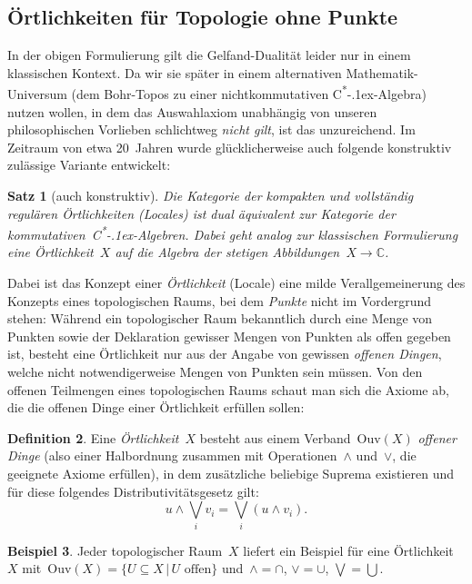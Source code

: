 \documentclass[a4paper,ngerman,12pt]{scrartcl}
\theoremstyle{definition}
\newtheorem{defn}{Definition}[section]
\newtheorem{bsp}[defn]{Beispiel}
\theoremstyle{plain}
\newtheorem{satz}[defn]{Satz}
\theoremstyle{remark}
\newcommand{\CC}{\mathbb{C}}
\newcommand{\Ouv}{\mathrm{Ouv}}
\newcommand{\csalgebra}{C\textsuperscript{*}\kern-.1ex-Algebra}
\newcommand{\csalgebren}{C\textsuperscript{*}\kern-.1ex-Alge\-bren}
\renewcommand{\_}{\mathpunct{.}\,}
\newcommand{\?}{\,{:}\,}
\begin{document}
\subsection{Örtlichkeiten für Topologie ohne Punkte}

In der obigen Formulierung gilt die Gelfand-Dualität leider nur in einem
klassischen Kontext. Da wir sie später in einem alternativen
Mathematik-Universum (dem Bohr-Topos zu einer nichtkommutativen \csalgebra)
nutzen wollen, in dem das Auswahlaxiom unabhängig von unseren philosophischen
Vorlieben schlichtweg \emph{nicht gilt}, ist das unzureichend. Im Zeitraum von
etwa 20~Jahren wurde glücklicherweise auch folgende konstruktiv zulässige Variante
entwickelt:

\begin{satz}[auch konstruktiv]Die Kategorie der kompakten und vollständig
regulären Örtlichkeiten (Locales) ist dual äquivalent zur Kategorie der
kommutativen~\csalgebren. Dabei geht analog zur klassischen Formulierung eine
Örtlichkeit~$X$ auf die Algebra der stetigen Abbildungen~$X \to \CC$.
\end{satz}

Dabei ist das Konzept einer \emph{Örtlichkeit} (Locale) eine milde
Verallgemeinerung des Konzepts eines topologischen Raums, bei dem \emph{Punkte}
nicht im Vordergrund stehen: Während ein topologischer Raum bekanntlich durch
eine Menge von Punkten sowie der Deklaration gewisser Mengen von Punkten als
offen gegeben ist, besteht eine Örtlichkeit nur aus der Angabe von
gewissen \emph{offenen Dingen}, welche nicht notwendigerweise Mengen von
Punkten sein müssen. Von den offenen Teilmengen eines topologischen Raums
schaut man sich die Axiome ab, die die offenen Dinge einer Örtlichkeit
erfüllen sollen:

\begin{defn}Eine \emph{Örtlichkeit}~$X$ besteht aus einem Verband~$\Ouv(X)$
\emph{offener Dinge} (also einer Halbordnung zusammen mit Operationen~$\wedge$
und~$\vee$, die geeignete Axiome erfüllen), in dem zusätzliche beliebige
Suprema existieren und für diese folgendes Distributivitätsgesetz gilt:
\[ u \wedge \bigvee_i v_i = \bigvee_i (u \wedge v_i). \]
\end{defn}

\begin{bsp}
Jeder topologischer Raum~$X$ liefert ein Beispiel für eine Örtlichkeit~$X$
mit~$\Ouv(X) = \{ U \subseteq X \,|\, \text{$U$ offen} \}$ und~$\wedge =
\cap$, $\vee = \cup$, $\bigvee = \bigcup$.\end{bsp}
\end{document}
